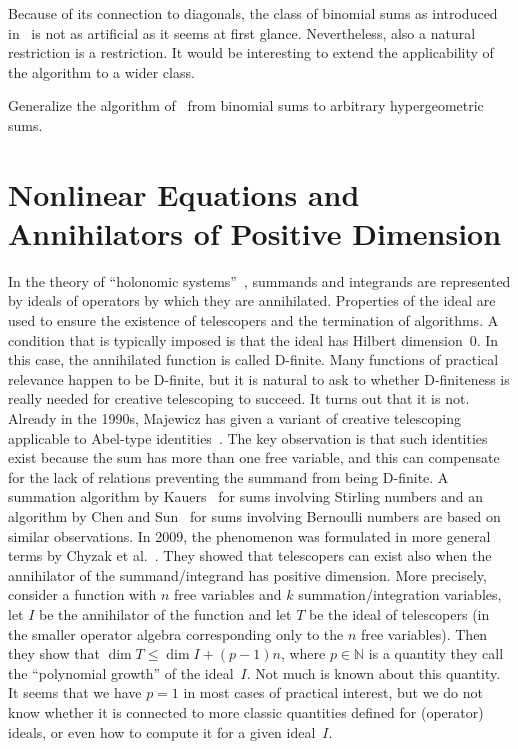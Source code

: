 \documentclass{jssc}
\let\set\mathbb
\begin{document}
 Because of its connection to diagonals, the class of binomial sums as introduced in~\cite{bostan15}
 is not as artificial as it seems at first glance. Nevertheless, also a natural restriction
 is a restriction. It would be interesting to extend the applicability of the algorithm to
 a wider class.

 \begin{problem}
   Generalize the algorithm of~\cite{bostan15} from binomial sums to arbitrary hypergeometric
   sums.
 \end{problem}

%

 \section{Nonlinear Equations and Annihilators of Positive Dimension}

 In the theory of ``holonomic systems''~\cite{zeilberger90}, summands and
 integrands are represented by ideals of operators by which they are
 annihilated. Properties of the ideal are used to ensure the existence of
 telescopers and the termination of algorithms. A condition that is typically
 imposed is that the ideal has Hilbert dimension~$0$. In this case, the
 annihilated function is called D-finite.  Many functions of practical relevance
 happen to be D-finite, but it is natural to ask to whether D-finiteness is
 really needed for creative telescoping to succeed. It turns out that it is not.
 Already in the 1990s, Majewicz has given a variant of creative telescoping
 applicable to Abel-type identities~\cite{majewicz96}. The key observation is
 that such identities exist because the sum has more than one free variable, and
 this can compensate for the lack of relations preventing the summand from being
 D-finite. A summation algorithm by Kauers~\cite{kauers07n} for sums involving
 Stirling numbers and an algorithm by Chen and Sun~\cite{chen09} for sums
 involving Bernoulli numbers are based on similar observations. In 2009, the
 phenomenon was formulated in more general terms by Chyzak et
 al.~\cite{chyzak09a}. They showed that telescopers can exist also when the
 annihilator of the summand/integrand has positive dimension. More precisely,
 consider a function with $n$ free variables and $k$ summation/integration
 variables, let $I$ be the annihilator of the function and let $T$ be the ideal
 of telescopers (in the smaller operator algebra corresponding only to the $n$
 free variables). Then they show that $\dim T\leq\dim I + (p-1)n$, where
 $p\in\set N$ is a quantity they call the ``polynomial growth'' of the
 ideal~$I$. Not much is known about this quantity. It seems that we have $p=1$
 in most cases of practical interest, but we do not know whether it is connected
 to more classic quantities defined for (operator) ideals, or even how to
 compute it for a given ideal~$I$.
\end{document}
